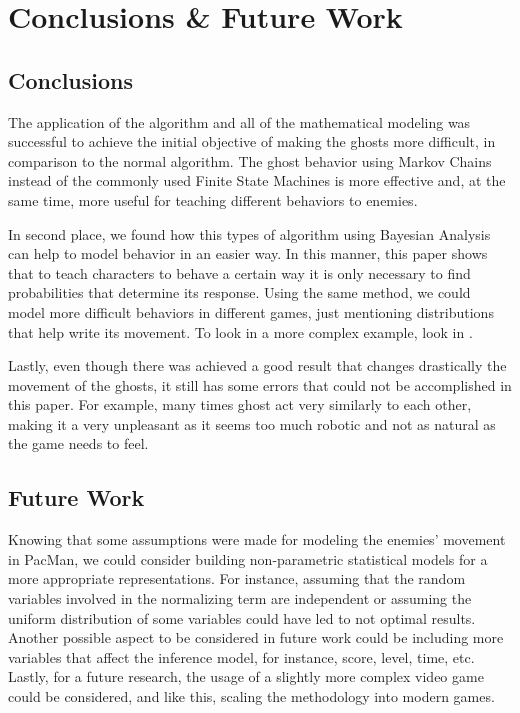\section{Conclusions \& Future Work}
\subsection{Conclusions}
The application of the algorithm and all of the mathematical modeling was successful to achieve the initial objective of making the ghosts more difficult, in comparison to the normal algorithm. The ghost behavior using Markov Chains instead of the commonly used Finite State Machines is more effective and, at the same time, more useful for teaching different behaviors to enemies.

In second place, we found how this types of algorithm using Bayesian Analysis can help to model behavior in an easier way. In this manner, this paper shows that to teach characters to behave a certain way it is only necessary to find probabilities that determine its response. Using the same method, we could model more difficult behaviors in different games, just mentioning distributions that help write its movement. To look in a more complex example, look in \cite{coue2003using}.

Lastly, even though there was achieved a good result that changes drastically the movement of the ghosts, it still has some errors that could not be accomplished in this paper. For example, many times ghost act very similarly to each other, making it a very unpleasant as it seems too much robotic and not as natural as the game needs to feel. 

\subsection{Future Work}
Knowing that some assumptions were made for modeling the enemies' movement in PacMan, we could consider building non-parametric statistical models for a more appropriate representations. For instance, assuming that the random variables involved in the normalizing term are independent or assuming the uniform distribution of some variables could have led to not optimal results. Another possible aspect to be considered in future work could be including more variables that affect the inference model, for instance, score, level, time, etc. Lastly, for a future research, the usage of a slightly more complex video game could be considered, and like this, scaling the methodology into modern games.
